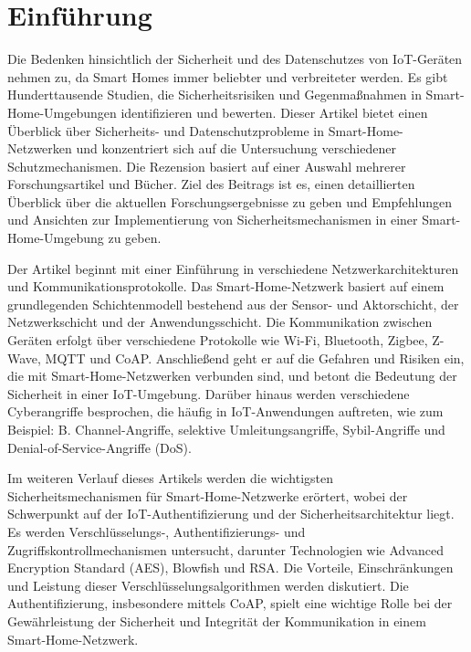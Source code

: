 
\usepackage{enumitem}
\usepackage{cite}
    
\usepackage{natbib}
\newcommand{\dozent}{Dr. Larissa Groth}
\newcommand{\veranstaltung}{IoT Network Security}
\newcommand{\semester}{SoSe23}
\newcommand{\studenten}{Zohreh Asadi, Aiman Al-Hazmi}


\tableofcontents
\newpage

\section{Einführung}

Die Bedenken hinsichtlich der Sicherheit und des Datenschutzes von IoT-Geräten nehmen zu, da Smart Homes immer beliebter und verbreiteter werden. Es gibt Hunderttausende Studien, die Sicherheitsrisiken und Gegenmaßnahmen in Smart-Home-Umgebungen identifizieren und bewerten. Dieser Artikel bietet einen Überblick über Sicherheits- und Datenschutzprobleme in Smart-Home-Netzwerken und konzentriert sich auf die Untersuchung verschiedener Schutzmechanismen. Die Rezension basiert auf einer Auswahl mehrerer Forschungsartikel und Bücher. Ziel des Beitrags ist es, einen detaillierten Überblick über die aktuellen Forschungsergebnisse zu geben und Empfehlungen und Ansichten zur Implementierung von Sicherheitsmechanismen in einer Smart-Home-Umgebung zu geben. 

Der Artikel beginnt mit einer Einführung in verschiedene Netzwerkarchitekturen und Kommunikationsprotokolle. Das Smart-Home-Netzwerk basiert auf einem grundlegenden Schichtenmodell bestehend aus der Sensor- und Aktorschicht, der Netzwerkschicht und der Anwendungsschicht. Die Kommunikation zwischen Geräten erfolgt über verschiedene Protokolle wie Wi-Fi, Bluetooth, Zigbee, Z-Wave, MQTT und CoAP. Anschließend geht er auf die Gefahren und Risiken ein, die mit Smart-Home-Netzwerken verbunden sind, und betont die Bedeutung der Sicherheit in einer IoT-Umgebung. Darüber hinaus werden verschiedene Cyberangriffe besprochen, die häufig in IoT-Anwendungen auftreten, wie zum Beispiel: B. Channel-Angriffe, selektive Umleitungsangriffe, Sybil-Angriffe und Denial-of-Service-Angriffe (DoS). 

Im weiteren Verlauf dieses Artikels werden die wichtigsten Sicherheitsmechanismen für Smart-Home-Netzwerke erörtert, wobei der Schwerpunkt auf der IoT-Authentifizierung und der Sicherheitsarchitektur liegt. Es werden Verschlüsselungs-, Authentifizierungs- und Zugriffskontrollmechanismen untersucht, darunter Technologien wie Advanced Encryption Standard (AES), Blowfish und RSA. Die Vorteile, Einschränkungen und Leistung dieser Verschlüsselungsalgorithmen werden diskutiert. Die Authentifizierung, insbesondere mittels CoAP, spielt eine wichtige Rolle bei der Gewährleistung der Sicherheit und Integrität der Kommunikation in einem Smart-Home-Netzwerk.

